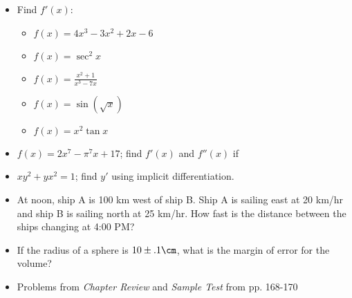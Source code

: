 \documentclass[fleqn]{exam}
\begin{document}
\begin{itemize}
\item
Find $f'(x)$:
\begin{itemize}
\item $f(x) = 4x^3 - 3x^2 + 2x - 6$
\item $f(x) = \sec^2 x$
\item $f(x) = \frac{x^2 + 1}{x^3 - 7x}$
\item $f(x) = \sin(\sqrt{x})$
\item $f(x) = x^2 \tan x$
\end{itemize}
\item $f(x) = 2x^7 - \pi^7 x + 17$; find $f'(x)$ and $f''(x)$ if 
\item $xy^2 + yx^2 = 1$; find $y'$ using implicit differentiation.
\item At noon, ship A is 100 km west of ship B.  Ship A is sailing east at 20 km/hr and ship B is sailing north at 25
  km/hr.  How fast is the distance between the ships changing at 4:00 PM?
\item If the radius of a sphere is $10 \pm .1 \cm$, what is the margin of error for the volume?
\item Problems from {\em Chapter Review} and {\em Sample Test} from pp. 168-170
\end{itemize}
\end{document}
